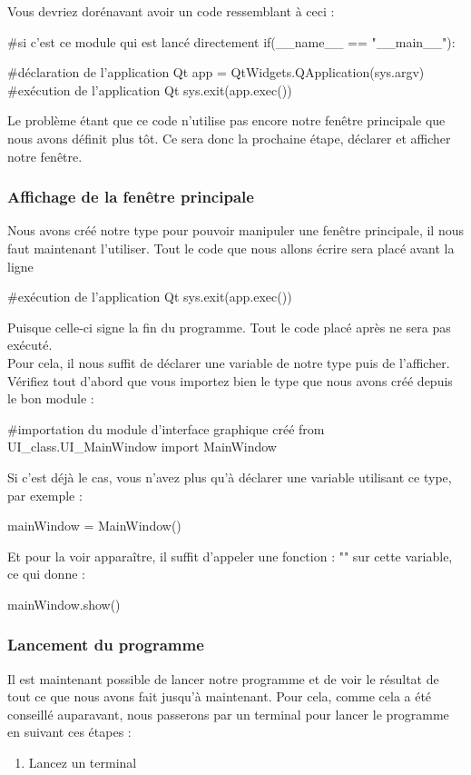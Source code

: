 {Vous devriez dorénavant avoir un code ressemblant à ceci :
\begin{Python}
#si c'est ce module qui est lancé directement
if(__name__ == "__main__"):

	#déclaration de l'application Qt
	app = QtWidgets.QApplication(sys.argv)
	#exécution de l'application Qt
	sys.exit(app.exec())
\end{Python}
Le problème étant que ce code n'utilise pas encore notre fenêtre principale que nous avons définit plus tôt.\newline
Ce sera donc la prochaine étape, déclarer et afficher notre fenêtre.

\subsubsection{Affichage de la fenêtre principale}

Nous avons créé notre type  pour pouvoir manipuler une fenêtre principale, il nous faut maintenant l'utiliser.\newline
Tout le code que nous allons écrire sera placé avant la ligne
\begin{Python}
    #exécution de l'application Qt
	sys.exit(app.exec())
\end{Python}
Puisque celle-ci signe la fin du programme. Tout le code placé après ne sera pas exécuté.\\

Pour cela, il nous suffit de déclarer une variable de notre type  puis de l'afficher.\newline
Vérifiez tout d'abord que vous importez bien le type que nous avons créé depuis le bon module :
\begin{Python}
#importation du module d'interface graphique créé
from UI_class.UI_MainWindow import MainWindow
\end{Python}
Si c'est déjà le cas, vous n'avez plus qu'à déclarer une variable utilisant ce type, par exemple :
\begin{Python}
mainWindow = MainWindow()
\end{Python}
Et pour la voir apparaître, il suffit d'appeler une fonction : "" sur cette variable, ce qui donne :
\begin{Python}
mainWindow.show()
\end{Python}



\subsubsection{Lancement du programme}
\label{tag-startProgFromCmdLine}
Il est maintenant possible de lancer notre programme et de voir le résultat de tout ce que nous avons fait jusqu'à maintenant.\newline
Pour cela, comme cela a été conseillé auparavant, nous passerons par un terminal pour lancer le programme en suivant ces étapes :
\begin{enumerate}
\item Lancez un terminal
    

\end{enumerate}}
